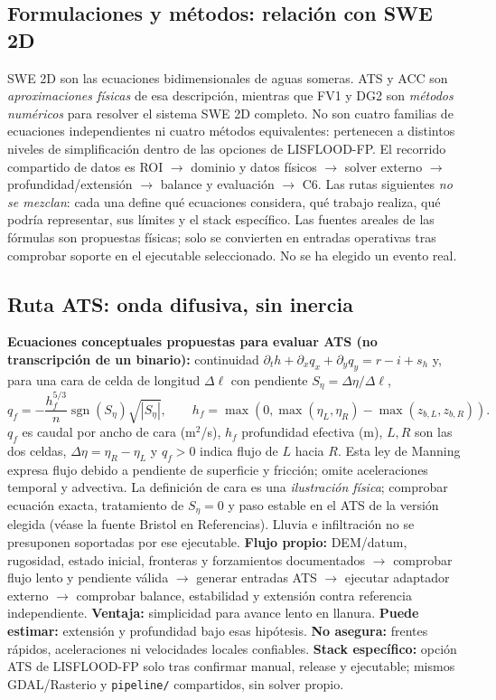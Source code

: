 \documentclass[11pt,a4paper]{article}
\begin{document}
\subsection{Formulaciones y métodos: relación con SWE 2D}
SWE 2D son las ecuaciones bidimensionales de aguas someras. ATS y ACC son \emph{aproximaciones físicas} de esa descripción, mientras que FV1 y DG2 son \emph{métodos numéricos} para resolver el sistema SWE 2D completo. No son cuatro familias de ecuaciones independientes ni cuatro métodos equivalentes: pertenecen a distintos niveles de simplificación dentro de las opciones de LISFLOOD-FP.
El recorrido compartido de datos es ROI $\rightarrow$ dominio y datos físicos $\rightarrow$ solver externo $\rightarrow$ profundidad/extensión $\rightarrow$ balance y evaluación $\rightarrow$ C6. Las rutas siguientes \emph{no se mezclan}: cada una define qué ecuaciones considera, qué trabajo realiza, qué podría representar, sus límites y el stack específico. Las fuentes areales de las fórmulas son propuestas físicas; solo se convierten en entradas operativas tras comprobar soporte en el ejecutable seleccionado. No se ha elegido un evento real.

\subsection{Ruta ATS: onda difusiva, sin inercia}
\textbf{Ecuaciones conceptuales propuestas para evaluar ATS (no transcripción de un binario):} continuidad $\partial_t h+\partial_x q_x+\partial_y q_y=r-i+s_h$ y, para una cara de celda de longitud $\Delta\ell$ con pendiente $S_\eta=\Delta\eta/\Delta\ell$,
\begin{equation}
q_f=-\frac{h_f^{5/3}}{n}\operatorname{sgn}(S_\eta)\sqrt{|S_\eta|},\qquad
h_f=\max\!\left(0,\max(\eta_L,\eta_R)-\max(z_{b,L},z_{b,R})\right).\label{eq:ats}
\end{equation}
$q_f$ es caudal por ancho de cara (m$^2$/s), $h_f$ profundidad efectiva (m), $L,R$ son las dos celdas, $\Delta\eta=\eta_R-\eta_L$ y $q_f>0$ indica flujo de $L$ hacia $R$. Esta ley de Manning expresa flujo debido a pendiente de superficie y fricción; omite aceleraciones temporal y advectiva. La definición de cara es una \emph{ilustración física}; comprobar ecuación exacta, tratamiento de $S_\eta=0$ y paso estable en el ATS de la versión elegida (véase la fuente Bristol en Referencias). Lluvia e infiltración no se presuponen soportadas por ese ejecutable.
\textbf{Flujo propio:} DEM/datum, rugosidad, estado inicial, fronteras y forzamientos documentados $\rightarrow$ comprobar flujo lento y pendiente válida $\rightarrow$ generar entradas ATS $\rightarrow$ ejecutar adaptador externo $\rightarrow$ comprobar balance, estabilidad y extensión contra referencia independiente. \textbf{Ventaja:} simplicidad para avance lento en llanura. \textbf{Puede estimar:} extensión y profundidad bajo esas hipótesis. \textbf{No asegura:} frentes rápidos, aceleraciones ni velocidades locales confiables. \textbf{Stack específico:} opción ATS de LISFLOOD-FP solo tras confirmar manual, release y ejecutable; mismos GDAL/Rasterio y \texttt{pipeline/} compartidos, sin solver propio.
\end{document}

